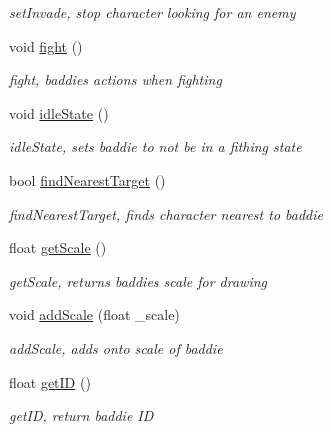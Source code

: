 \begin{DoxyCompactItemize}
\begin{DoxyCompactList}\small\item\em set\+Invade, stop character looking for an enemy \end{DoxyCompactList}\item 
\hypertarget{class_baddie_a990beca4ceda08987016ef154b02043d}{}void \hyperlink{class_baddie_a990beca4ceda08987016ef154b02043d}{fight} ()\label{class_baddie_a990beca4ceda08987016ef154b02043d}

\begin{DoxyCompactList}\small\item\em fight, baddies actions when fighting \end{DoxyCompactList}\item 
\hypertarget{class_baddie_a12f930c2838459fd8ec218e4b849d6ff}{}void \hyperlink{class_baddie_a12f930c2838459fd8ec218e4b849d6ff}{idle\+State} ()\label{class_baddie_a12f930c2838459fd8ec218e4b849d6ff}

\begin{DoxyCompactList}\small\item\em idle\+State, sets baddie to not be in a fithing state \end{DoxyCompactList}\item 
\hypertarget{class_baddie_af6ff48b973d7f5c9e20774918bfd8638}{}bool \hyperlink{class_baddie_af6ff48b973d7f5c9e20774918bfd8638}{find\+Nearest\+Target} ()\label{class_baddie_af6ff48b973d7f5c9e20774918bfd8638}

\begin{DoxyCompactList}\small\item\em find\+Nearest\+Target, finds character nearest to baddie \end{DoxyCompactList}\item 
float \hyperlink{class_baddie_a70eab6bc59c0b057553d40382295ac5e}{get\+Scale} ()
\begin{DoxyCompactList}\small\item\em get\+Scale, returns baddie\textquotesingle{}s scale for drawing \end{DoxyCompactList}\item 
void \hyperlink{class_baddie_a1ac904c81d042107fec6b853de2af5e3}{add\+Scale} (float \+\_\+scale)
\begin{DoxyCompactList}\small\item\em add\+Scale, adds onto scale of baddie \end{DoxyCompactList}\item 
float \hyperlink{class_baddie_a6f82148ee1c08fa35390e17ce8e5c679}{get\+I\+D} ()
\begin{DoxyCompactList}\small\item\em get\+I\+D, return baddie I\+D \end{DoxyCompactList}\end{DoxyCompactItemize}
